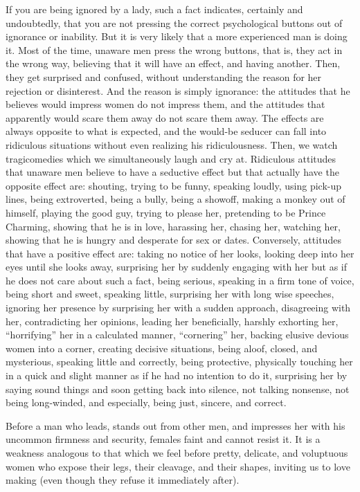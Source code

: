 \par If you are being ignored by a lady, such a fact indicates, certainly and undoubtedly, that you are not pressing the correct psychological buttons out of ignorance or inability. But it is very likely that a more experienced man is doing it. Most of the time, unaware men press the wrong buttons, that is, they act in the wrong way, believing that it will have an effect, and having another. Then, they get surprised and confused, without understanding the reason for her rejection or disinterest. And the reason is simply ignorance: the attitudes that he believes would impress women do not impress them, and the attitudes that apparently would scare them away do not scare them away. The effects are always opposite to what is expected, and the would-be seducer can fall into ridiculous situations without even realizing his ridiculousness. Then, we watch tragicomedies which we simultaneously laugh and cry at. Ridiculous attitudes that unaware men believe to have a seductive effect but that actually have the opposite effect are: shouting, trying to be funny, speaking loudly, using pick-up lines, being extroverted, being a bully, being a showoff, making a monkey out of himself, playing the good guy, trying to please her, pretending to be Prince Charming, showing that he is in love, harassing her, chasing her, watching her, showing that he is hungry and desperate for sex or dates. Conversely, attitudes that have a positive effect are: taking no notice of her looks, looking deep into her eyes until she looks away, surprising her by suddenly engaging with her but as if he does not care about such a fact, being serious, speaking in a firm tone of voice, being short and sweet, speaking little, surprising her with long wise speeches, ignoring her presence by surprising her with a sudden approach, disagreeing with her, contradicting her opinions, leading her beneficially, harshly exhorting her, \enquote{horrifying} her in a calculated manner, \enquote{cornering} her, backing elusive devious women into a corner, creating decisive situations, being aloof, closed, and mysterious, speaking little and correctly, being protective, physically touching her in a quick and slight manner as if he had no intention to do it, surprising her by saying sound things and soon getting back into silence, not talking nonsense, not being long-winded, and especially, being just, sincere, and correct.

\par Before a man who leads, stands out from other men, and impresses her with his uncommon firmness and security, females faint and cannot resist it. It is a weakness analogous to that which we feel before pretty, delicate, and voluptuous women who expose their legs, their cleavage, and their shapes, inviting us to love making (even though they refuse it immediately after).

